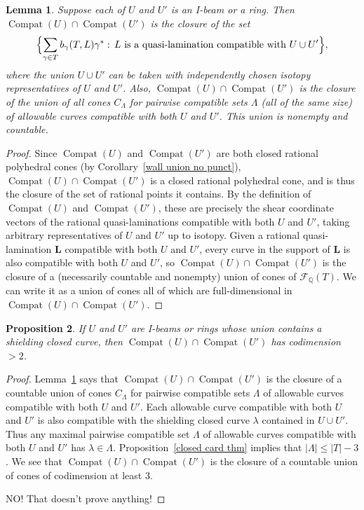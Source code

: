 \documentclass{amsart}
\newtheorem{proposition}{Proposition}[section]
\newtheorem{lemma}[proposition]{Lemma}
\theoremstyle{definition}
\theoremstyle{remark}
\numberwithin{equation}{section}
\newcommand{\rationals}{\mathbb Q}
\newcommand{\settt}[1]{{\Bigl\lbrace #1 \Bigr\rbrace}}
\newcommand{\F}{{\mathcal F}}
\newcommand{\0}{{\mathbf{0}}}
\renewcommand{\L}{\mathbf{L}}
\newcommand{\Compat}{\operatorname{Compat}}
\begin{document}
\begin{lemma}\label{DTL gen int prop}
Suppose each of $U$ and $U'$ is an I-beam or a ring.  
Then $\Compat(U)\cap\Compat(U')$ is the closure of the set 
\[\settt{\sum_{\gamma\in T}b_\gamma(T,L)\gamma^*:\,L\text{ is a quasi-lamination compatible with }U\cup U'},\]
where the union $U\cup U'$ can be taken with independently chosen isotopy representatives of $U$ and $U'$.	
Also, $\Compat(U)\cap\Compat(U')$ is the closure of the union of all cones $C_{\Lambda}$ for pairwise compatible sets $\Lambda$ (all of the same size) of allowable curves compatible with both $U$ and $U'$.
This union is nonempty and countable.
\end{lemma}
\begin{proof}
Since $\Compat(U)$ and $\Compat(U')$ are both closed rational polyhedral cones (by Corollary~\ref{wall union no punct}), $\Compat(U)\cap\Compat(U')$ is a closed rational polyhedral cone, and is thus the closure of the set of rational points it contains.
By the definition of $\Compat(U)$ and $\Compat(U')$, these are precisely the shear coordinate vectors of the rational quasi-laminations compatible with both $U$ and $U'$, taking arbitrary representatives of $U$ and $U'$ up to isotopy.
Given a rational quasi-lamination $\L$ compatible with both $U$ and $U'$, every curve in the support of $\L$ is also compatible with both $U$ and $U'$, so $\Compat(U)\cap\Compat(U')$ is the closure of a (necessarily countable and nonempty) union of cones of $\F_\rationals(T)$.
We can write it as a union of cones all of which are full-dimensional in $\Compat(U)\cap\Compat(U')$.
\end{proof}

\begin{proposition}\label{int shielding}
If $U$ and $U'$ are I-beams or rings whose union contains a shielding closed curve, then 
$\Compat(U)\cap\Compat(U')$ has codimension $>2$.
\end{proposition}
\begin{proof}
Lemma~\ref{DTL gen int prop} says that $\Compat(U)\cap\Compat(U')$ is the closure of a countable union of cones $C_{\Lambda}$ for pairwise compatible sets $\Lambda$ of allowable curves compatible with both $U$ and $U'$.
Each allowable curve compatible with both $U$ and $U'$ is also compatible with the shielding closed curve $\lambda$ contained in $U\cup U'$.
Thus any maximal pairwise compatible set $\Lambda$ of allowable curves compatible with both $U$ and $U'$ has $\lambda\in\Lambda$.
Proposition~\ref{closed card thm} implies that $|\Lambda|\le|T|-3$.
We see that $\Compat(U)\cap\Compat(U')$ is the closure of a countable union of cones of codimension at least $3$.



NO!  That doesn't prove anything!

\end{proof}
\end{document}
